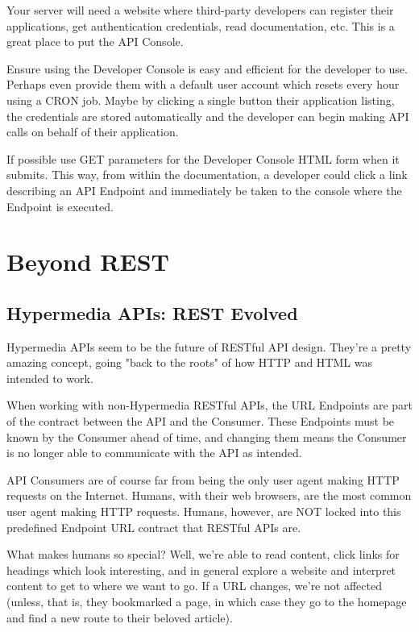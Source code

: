 \documentclass{book}
\begin{document}
Your server will need a website where third-party developers can register their applications, get authentication credentials, read documentation, etc. This is a great place to put the API Console.

Ensure using the Developer Console is easy and efficient for the developer to use. Perhaps even provide them with a default user account which resets every hour using a CRON job. Maybe by clicking a single button their application listing, the credentials are stored automatically and the developer can begin making API calls on behalf of their application.

If possible use GET parameters for the Developer Console HTML form when it submits. This way, from within the documentation, a developer could click a link describing an API Endpoint and immediately be taken to the console where the Endpoint is executed.


\chapter{Beyond REST}

\section{Hypermedia APIs: REST Evolved}

Hypermedia APIs seem to be the future of RESTful API design. They're a pretty amazing concept, going "back to the roots" of how HTTP and HTML was intended to work.

When working with non-Hypermedia RESTful APIs, the URL Endpoints are part of the contract between the API and the Consumer. These Endpoints must be known by the Consumer ahead of time, and changing them means the Consumer is no longer able to communicate with the API as intended.

API Consumers are of course far from being the only user agent making HTTP requests on the Internet. Humans, with their web browsers, are the most common user agent making HTTP requests. Humans, however, are NOT locked into this predefined Endpoint URL contract that RESTful APIs are.

What makes humans so special? Well, we're able to read content, click links for headings which look interesting, and in general explore a website and interpret content to get to where we want to go. If a URL changes, we're not affected (unless, that is, they bookmarked a page, in which case they go to the homepage and find a new route to their beloved article).
\end{document}

